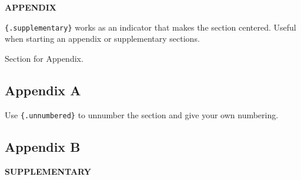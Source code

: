 \documentclass[
  11pt]{article}
\begin{document}
\renewcommand{\bibsection}{}


\label{appendix}
\bigskip

\begin{center}

{\large\bf APPENDIX}

\end{center}

\texttt{\{.supplementary\}} works as an indicator that makes the section
centered. Useful when starting an appendix or supplementary sections.

Section for Appendix.

\subsection*{Appendix A}\label{appendix-a}

Use \texttt{\{.unnumbered\}} to unnumber the section and give your own
numbering.

\subsection*{Appendix B}\label{appendix-b}

\label{supplementary}
\bigskip

\begin{center}

{\large\bf SUPPLEMENTARY}

\end{center}
\end{document}
